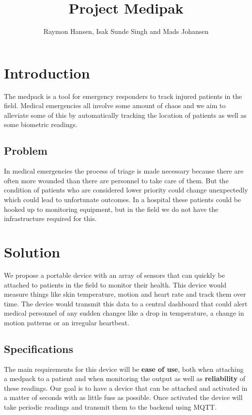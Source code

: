 

\title{Project Medipak}
\author{Raymon Hansen, Isak Sunde Singh and Mads Johansen}


\maketitle

\section*{Introduction}
The medpack is a tool for emergency responders to track injured patients in the field. Medical emergencies all involve some amount of chaos and we aim to alleviate some of this by automatically tracking the location of patients as well as some biometric readings.

    \subsection*{Problem}
    In medical emergencies the process of triage is made necessary because there are often more wounded than there are personnel to take care of them. But the condition of patients who are considered lower priority could change unexpectedly which could lead to unfortunate outcomes. In a hospital these patients could be hooked up to monitoring equipment, but in the field we do not have the infrastructure required for this.

\section*{Solution}
We propose a portable device with an array of sensors that can quickly be attached to patients in the field to monitor their health. This device would measure things like skin temperature, motion and heart rate and track them over time. The device would transmit this data to a central dashboard that could alert medical personnel of any sudden changes like a drop in temperature, a change in motion patterns or an irregular heartbeat.

    \subsection*{Specifications}
    The main requirements for this device will be \textbf{ease of use}, both when attaching a medpack to a patient and when monitoring the output as well as \textbf{reliability} of these readings. Our goal is to have a device that can be attached and activated in a matter of seconds with as little fuss as possible. Once activated the device will take periodic readings and transmit them to the backend using MQTT.

